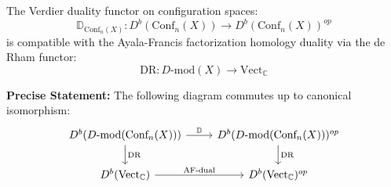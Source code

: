 \begin{theorem}\label{thm:verdier-AF-compat}
The Verdier duality functor on configuration spaces:
$$\mathbb{D}_{\text{Conf}_n(X)}: D^b(\text{Conf}_n(X)) \to D^b(\text{Conf}_n(X))^{op}$$
is compatible with the Ayala-Francis factorization homology duality via the de Rham functor:
$$\text{DR}: D\text{-mod}(X) \to \text{Vect}_\mathbb{C}$$

\textbf{Precise Statement:} The following diagram commutes up to canonical isomorphism:
$$
\begin{tikzcd}
D^b(D\text{-mod}(\text{Conf}_n(X))) \arrow[r, "\mathbb{D}"] \arrow[d, "\text{DR}"] 
& D^b(D\text{-mod}(\text{Conf}_n(X)))^{op} \arrow[d, "\text{DR}"] \\
D^b(\text{Vect}_\mathbb{C}) \arrow[r, "\text{AF-dual}"] & D^b(\text{Vect}_\mathbb{C})^{op}
\end{tikzcd}
$$
\end{theorem}

